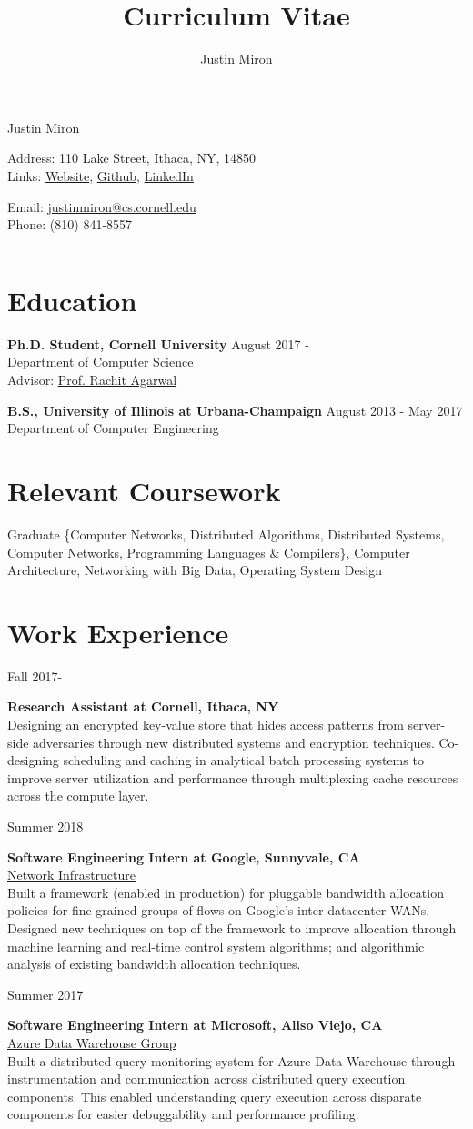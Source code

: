 \documentclass[10pt]{article}
\title{Curriculum Vitae}
\author{Justin Miron}
\makeatletter
\newcommand{\Hrule}{\par\rule{\linewidth}{0.3mm}}
\newcommand{\leftrightrow}[2]{
	#1 \hfill #2 \\
}
\newcommand{\titlesection}{
\parindent=0pt
\setlength{\parskip}{0.1em}

\par{\begin{center}\LARGE Justin Miron\end{center}}

\begin{minipage}[t]{0.40\textwidth}
Address: 110 Lake Street, Ithaca, NY, 14850 \\
Links: \href{http://justinmiron.com}{Website}, \href{https://github.com/jmiron11}{Github}, \href{https://www.linkedin.com/in/justinmiron/}{LinkedIn}
\end{minipage}
\hfill
\begin{minipage}[t]{0.40\textwidth}
Email: \href{mailto:justinmiron@cs.cornell.edu}{justinmiron@cs.cornell.edu} \\
Phone: (810) 841-8557
\end{minipage}
\vspace{0.3em}
\Hrule
}
\newcommand{\workblock}[4]{
\begin{minipage}[t]{0.14\textwidth}
\vspace*{0.4em}
\begin{flushright}#3\end{flushright}
\end{minipage}
\hfill\vline\hfill
\begin{minipage}[t]{0.82\textwidth}
\vspace*{0.4em}
	\textbf{#1} \\
	#2 \\
    #4
\end{minipage}
\vspace{0.7em}
}
\newcommand{\workblocktwo}[3]{
\begin{minipage}[t]{0.14\textwidth}
\vspace*{0.4em}
\begin{flushright}#2\end{flushright}
\end{minipage}
\hfill\vline\hfill
\begin{minipage}[t]{0.82\textwidth}
\vspace*{0.4em}
	\textbf{#1} \\
    #3
\end{minipage}
\vspace{0.7em}
}
\newcommand{\educationblock}[3]{
	\leftrightrow{\textbf{#1}}{#2}
    #3
}
\makeatother
\begin{document}
\titlesection
\setlength{\parskip}{0em}
\vspace{-2.5em}
\section{Education}
\vspace{0.1em}
\educationblock{Ph.D. Student, Cornell University}{August 2017 - }{Department of Computer Science \\
Advisor: \href{http://www.cs.cornell.edu/~ragarwal/}{Prof. Rachit Agarwal}}
\vspace{0.5em}

\educationblock{B.S., University of Illinois at Urbana-Champaign}{August 2013 - May 2017}{Department of Computer Engineering}

\section{Relevant Coursework}
\vspace{0.1em}
Graduate \{Computer Networks, Distributed Algorithms, Distributed Systems, Computer Networks, Programming Languages \& Compilers\}, Computer Architecture, Networking with Big Data, Operating System Design

\section{Work Experience}
\vspace{-0.4em}
\workblocktwo{Research Assistant at Cornell, Ithaca, NY}{Fall 2017-}{
Designing an encrypted key-value store that hides access patterns from server-side adversaries through
new distributed systems and encryption techniques.
Co-designing scheduling and caching in analytical batch processing systems to improve server utilization and performance through multiplexing cache resources across the compute layer.}

\workblock{Software Engineering Intern at Google, Sunnyvale, CA}{\href{https://ai.google/research/pubs/pub43838}{Network Infrastructure}}{Summer 2018}{
Built a framework (enabled in production) for pluggable bandwidth allocation policies for fine-grained groups of flows on Google's inter-datacenter WANs. Designed new techniques on top of the framework to improve allocation through machine learning and real-time control system algorithms; and algorithmic analysis of existing bandwidth allocation techniques.
}

\workblock{Software Engineering Intern at Microsoft, Aliso Viejo, CA}{\href{https://azure.microsoft.com/en-us/services/sql-data-warehouse/}{Azure Data Warehouse Group}}{Summer 2017}{
Built a distributed query monitoring system for Azure Data Warehouse through instrumentation and communication across distributed query execution components. This enabled understanding query execution across disparate components for easier debuggability and performance profiling.}
\end{document}
